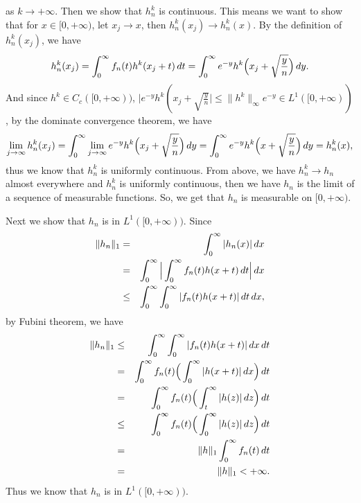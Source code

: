 \documentclass[12pt,a4paper]{ctexart}
\begin{document}
as $k \to + \infty$. Then we show that $h_{n}^{k}$ is continuous. This means we want to show that for $x \in [0, + \infty)$, let $x_{j} \to x$, then $h_{n}^{k} (x_{j}) \to h_{n}^{k} (x)$. By the definition of $h_{n}^{k} (x_{j})$, we have
\begin{equation*}
    h_{n}^{k} (x_{j}) = \int_{0}^{\infty} f_{n}(t) h^{k}(x_{j} + t) \, d t = \int_{0}^{\infty} e^{-y} h^{k} \Big{(} x_{j} + \sqrt{\frac{y}{n}} \Big{)} \, d y.
\end{equation*}
And since $h^{k} \in C_{c}([0, + \infty))$, $| e^{-y} h^{k} ( x_{j} + \sqrt{\frac{y}{n}} | \leq \|h^{k}\|_{\infty} e^{-y} \in L^{1}([0, + \infty))$, by the dominate convergence theorem, we have
\begin{equation*}
    \lim_{j \to \infty} h_{n}^{k} (x_{j}) = \int_{0}^{\infty} \lim_{j \to \infty} e^{-y} h^{k} \Big{(} x_{j} + \sqrt{\frac{y}{n}} \Big{)} \, d y = \int_{0}^{\infty} e^{-y} h^{k} \Big{(} x + \sqrt{\frac{y}{n}} \Big{)} \, d y = h_{n}^{k} (x),
\end{equation*}
thus we know that $h_{n}^{k}$ is uniformly continuous. From above, we have $h_{n}^{k} \to h_{n}$ almost everywhere and $h_{n}^{k}$ is uniformly continuous, then we have $h_{n}$ is the limit of a sequence of measurable functions. So, we get that $h_{n}$ is measurable on $[0, + \infty)$.

Next we show that $h_{n}$ is in $L^{1}([0, + \infty))$. Since
\begin{eqnarray*}
\|h_{n}\|_{1}  & = & \int_{0}^{\infty} |h_{n} (x)| \, d x  \\
 & = & \int_{0}^{\infty} \Big{|} \int_{0}^{\infty} f_{n} (t) h(x + t) \, d t  \Big{|} \, d x \\
 & \leq & \int_{0}^{\infty} \int_{0}^{\infty} | f_{n} (t) h(x + t) | \, d t \, d x, 
\end{eqnarray*}
by Fubini theorem, we have
\begin{eqnarray*}
\|h_{n}\|_{1}  & \leq & \int_{0}^{\infty} \int_{0}^{\infty} | f_{n} (t) h(x + t) | \, d x \, d t \\
& = & \int_{0}^{\infty} f_{n} (t) \Big{(} \int_{0}^{\infty}  | h(x + t) | \, d x \Big{)} \, d t \\
& = & \int_{0}^{\infty} f_{n} (t) \Big{(} \int_{t}^{\infty}  | h(z) | \, d z \Big{)} \, d t \\
& \leq & \int_{0}^{\infty} f_{n} (t) \Big{(} \int_{0}^{\infty}  | h(z) | \, d z \Big{)} \, d t \\
& = & \|h\|_{1} \int_{0}^{\infty} f_{n} (t) \, d t \\ 
& = & \|h\|_{1} < + \infty.
\end{eqnarray*}
Thus we know that $h_{n}$ is in $L^{1}([0, + \infty))$.
\end{document}
